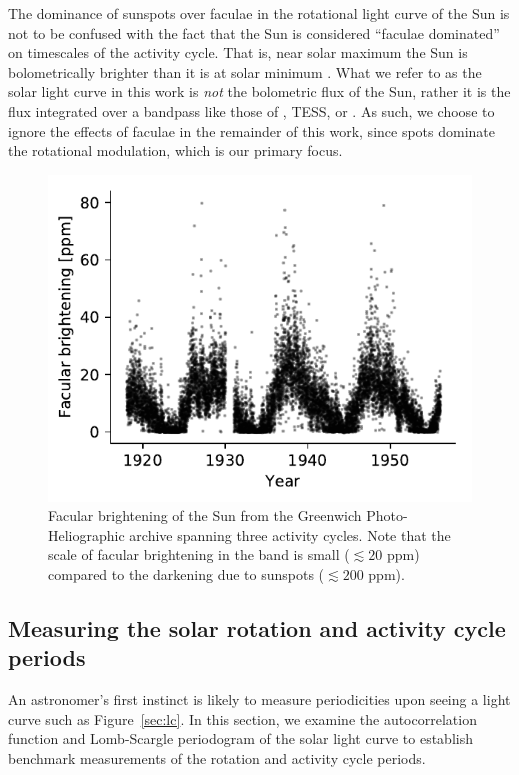The dominance of sunspots over faculae in the rotational light curve of the Sun is not to be confused with the fact that the Sun is considered ``faculae dominated''  on timescales of the activity cycle. That is, near solar maximum the Sun is bolometrically brighter than it is at solar minimum \citep{Solanki2013}. What we refer to as the solar light curve in this work is \textit{not} the bolometric flux of the Sun, rather it is the flux integrated over a bandpass like those of \kepler, TESS, or \gaia. As such, we choose to ignore the effects of faculae in the remainder of this work, since spots dominate the rotational modulation, which is our primary focus. 

\begin{figure}
  \centering
  \includegraphics[scale=0.8]{howard/faculae.pdf}
  \caption{Facular brightening of the Sun from the Greenwich Photo-Heliographic archive spanning three activity cycles. Note that the scale of facular brightening in the \kepler band is small ($\lesssim 20$ ppm) compared to the darkening due to sunspots ($\lesssim 200$ ppm).}
  \label{fig:faculae}
\end{figure}


\subsection{Measuring the solar rotation and activity cycle periods} \label{sec:gp}

An astronomer's first instinct is likely to measure periodicities upon seeing a light curve such as Figure~\ref{sec:lc}. In this section, we examine the autocorrelation function and Lomb-Scargle periodogram of the solar light curve to establish benchmark measurements of the rotation and activity cycle periods.

